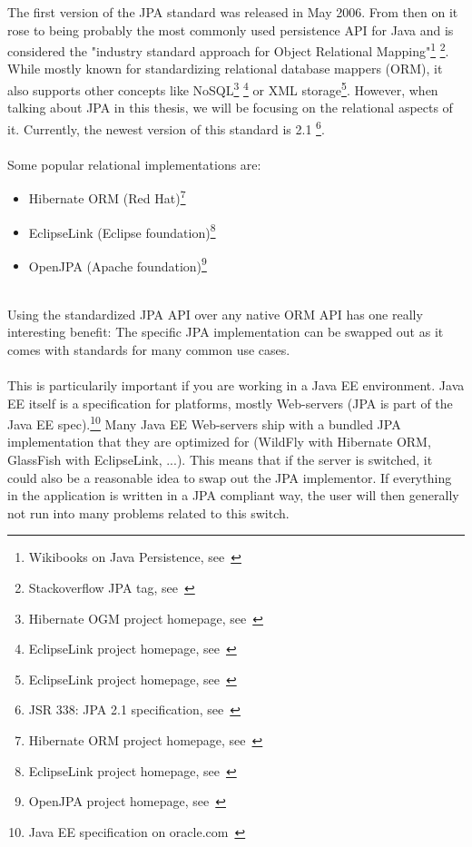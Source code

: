 The first version of the JPA standard was released in May 2006. From then on it rose to being probably the most commonly used persistence API for Java and is considered the "industry standard approach for Object Relational Mapping"\footnote{Wikibooks on Java Persistence, see~\cite{wikibooks_on_jpa}} \footnote{Stackoverflow JPA tag, see~\cite{stackoverflow_jpa}}. While mostly known for standardizing relational database mappers (ORM), it also supports other concepts like NoSQL\footnote{Hibernate OGM project homepage, see~\cite{hibernate_ogm}} \footnote{EclipseLink project homepage, see~\cite{eclipselink}} or XML storage\footnote{EclipseLink project homepage, see~\cite{eclipselink}}. However, when talking about JPA in this thesis, we will be focusing on the relational aspects of it. Currently, the newest version of this standard is 2.1 \footnote{JSR 338: JPA 2.1 specification, see~\cite{jpa_21_jcp}}.
\\\\
Some popular relational implementations are:
\begin{itemize}
	\item Hibernate ORM (Red Hat)\footnote{Hibernate ORM project homepage, see~\cite{hibernate_orm}}
	\item EclipseLink (Eclipse foundation)\footnote{EclipseLink project homepage, see~\cite{eclipselink}}
	\item OpenJPA (Apache foundation)\footnote{OpenJPA project homepage, see~\cite{openjpa}}
\end{itemize}
~\\
Using the standardized JPA API over any native ORM API has one really interesting benefit:
The specific JPA implementation can be swapped out as it comes with standards for many common use cases.
\\\\
This is particularily important if you are working in a Java EE environment. Java EE itself is a specification for platforms, mostly Web-servers (JPA is part of the Java EE spec).\footnote{Java EE specification on oracle.com~\cite{java_ee_spec}} Many Java EE Web-servers ship with a bundled JPA implementation that they are optimized for (WildFly with Hibernate ORM, GlassFish with EclipseLink, ...). This means that if the server is switched, it could also be a reasonable idea to swap out the JPA implementor. If everything in the application is written in a JPA compliant way, the user will then generally not run into many problems related to this switch.

\pagebreak

